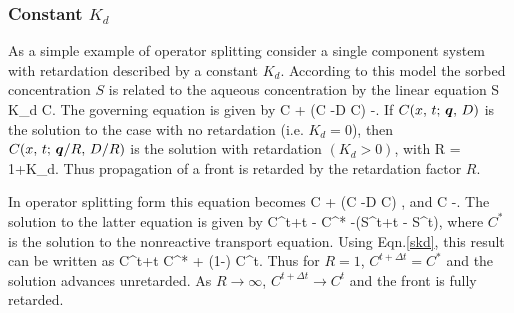 \subsubsection{Constant $K_d$}

As a simple example of operator splitting consider a single component system with retardation described by a constant $K_d$. According to this model the sorbed concentration $S$ is related to the aqueous concentration by the linear equation
\EQ\label{skd}
S \eq K_d C.
\EN
The governing equation is given by
\EQ
{} \varphi C + \bnabla\cdot\big(\bq C -\varphi D \bnabla C\big) \eq -.
\EN
If $C(x,\,t;\, \boldsymbol{q},\,D)$ is the solution to the case with no retardation (i.e. $K_d=0$), then $C(x,\,t;\, \boldsymbol{q}/R,\,D/R)$ is the solution with retardation $(K_d>0)$,
with
\EQ
R = 1+K_d.
\EN
Thus propagation of a front is retarded by the retardation factor $R$.

In operator splitting form this equation becomes
\EQ
{} \varphi C + \bnabla\cdot\big(\bq C -\varphi D \bnabla C\big) ,
\EN
and
\EQ
{} \varphi C \eq -.
\EN
The solution to the latter equation is given by
\EQ
\varphi C^{t+\Delta t} - \varphi C^* \eq -\big(S^{t+\Delta t} - S^t\big),
\EN
where $C^*$ is the solution to the nonreactive transport equation. Using Eqn.\eqref{skd}, this result can be written as
\EQ
C^{t+\Delta t} \eq {} C^* + \left(1-\right) C^t.
\EN
Thus for $R=1$, $C^{t+\Delta t}=C^*$ and the solution advances unretarded. As $R\rightarrow\infty$, $C^{t+\Delta t} \rightarrow C^t$ and the front is fully retarded.

